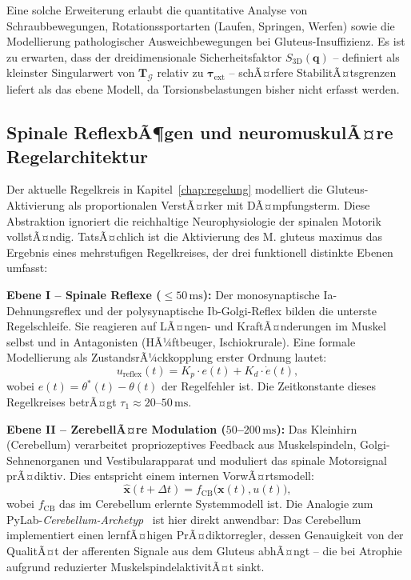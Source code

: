 ﻿\documentclass[12pt,a4paper]{report}
\theoremstyle{plain}
\theoremstyle{definition}
\theoremstyle{remark}
\begin{document}
	Eine solche Erweiterung erlaubt die quantitative Analyse von Schraubbewegungen,
	Rotationssportarten (Laufen, Springen, Werfen) sowie die Modellierung
	pathologischer Ausweichbewegungen bei Gluteus-Insuffizienz.
	Es ist zu erwarten, dass der dreidimensionale Sicherheitsfaktor
	$S_{\mathrm{3D}}(\mathbf{q})$ -- definiert als kleinster Singularwert von
	$\mathbf{T}_\mathcal{G}$ relativ zu $\boldsymbol{\tau}_{\mathrm{ext}}$ --
	schÃ¤rfere StabilitÃ¤tsgrenzen liefert als das ebene Modell, da
	Torsionsbelastungen bisher nicht erfasst werden.
	
	\subsection{Spinale ReflexbÃ¶gen und neuromuskulÃ¤re Regelarchitektur}
	\label{subsec:reflexe}
	
	Der aktuelle Regelkreis in Kapitel~\ref{chap:regelung} modelliert die
	Gluteus-Aktivierung als proportionalen VerstÃ¤rker mit DÃ¤mpfungsterm.
	Diese Abstraktion ignoriert die reichhaltige Neurophysiologie der
	spinalen Motorik vollstÃ¤ndig. TatsÃ¤chlich ist die Aktivierung des
	M. gluteus maximus das Ergebnis eines mehrstufigen Regelkreises,
	der drei funktionell distinkte Ebenen umfasst:
	
	\textbf{Ebene I -- Spinale Reflexe ($\leq 50\,\mathrm{ms}$):}
	Der monosynaptische Ia-Dehnungsreflex und der polysynaptische
	Ib-Golgi-Reflex bilden die unterste Regelschleife. Sie reagieren
	auf LÃ¤ngen- und KraftÃ¤nderungen im Muskel selbst und in
	Antagonisten (HÃ¼ftbeuger, Ischiokrurale). Eine formale Modellierung
	als ZustandsrÃ¼ckkopplung erster Ordnung lautet:
	\[
	u_{\mathrm{reflex}}(t) = K_p \cdot e(t) + K_d \cdot \dot{e}(t),
	\]
	wobei $e(t) = \theta^*(t) - \theta(t)$ der Regelfehler ist.
	Die Zeitkonstante dieses Regelkreises betrÃ¤gt $\tau_1 \approx 20$--$50\,\mathrm{ms}$.
	
	\textbf{Ebene II -- ZerebellÃ¤re Modulation ($50$--$200\,\mathrm{ms}$):}
	Das Kleinhirn (Cerebellum) verarbeitet propriozeptives Feedback aus
	Muskelspindeln, Golgi-Sehnenorganen und Vestibularapparat und
	moduliert das spinale Motorsignal prÃ¤diktiv. Dies entspricht
	einem internen VorwÃ¤rtsmodell:
	\[
	\hat{\mathbf{x}}(t+\Delta t) = f_{\mathrm{CB}}\bigl(\mathbf{x}(t), u(t)\bigr),
	\]
	wobei $f_{\mathrm{CB}}$ das im Cerebellum erlernte Systemmodell ist.
	Die Analogie zum PyLab-\emph{Cerebellum-Archetyp}~\cite{epp2026wolke}
	ist hier direkt anwendbar: Das Cerebellum implementiert einen
	lernfÃ¤higen PrÃ¤diktorregler, dessen Genauigkeit von der QualitÃ¤t
	der afferenten Signale aus dem Gluteus abhÃ¤ngt -- die bei Atrophie
	aufgrund reduzierter MuskelspindelaktivitÃ¤t sinkt.
	
\end{document}
